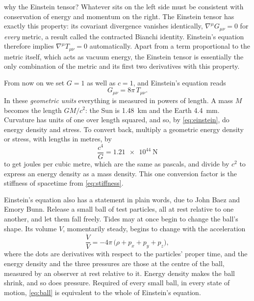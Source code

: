 \begin{deeper}{why the Einstein tensor?}
Whatever sits on the left side must be consistent with conservation of energy
and momentum on the right. The Einstein tensor has exactly this property: its
covariant divergence vanishes identically, $\nabla^{\mu}G_{\mu\nu} = 0$ for
\emph{every} metric, a result called the contracted Bianchi identity.
Einstein's equation therefore implies $\nabla^{\mu}T_{\mu\nu} = 0$
automatically. Apart from a term proportional to the metric itself, which acts
as vacuum energy, the Einstein tensor is essentially the only combination of
the metric and its first two derivatives with this property.
\end{deeper}

From now on we set $G = 1$ as well as $c = 1$, and Einstein's equation reads
\begin{equation}
  G_{\mu\nu} = 8\pi\,T_{\mu\nu}.
  \label{eq:einstein}
\end{equation}
In these \emph{geometric units} everything is measured in powers of length. A
mass $M$ becomes the length $GM/c^{2}$: the Sun is \SI{1.48}{\kilo\metre} and
the Earth \SI{4.4}{\milli\metre}. Curvature has units of one over length
squared, and so, by \cref{eq:einstein}, do energy density and stress. To
convert back, multiply a geometric energy density or stress, with lengths in
metres, by
\begin{equation}
  \frac{c^{4}}{G} = \SI{1.21e44}{\newton}
  \label{eq:conversion}
\end{equation}
to get joules per cubic metre, which are the same as pascals, and divide by
$c^{2}$ to express an energy density as a mass density. This one conversion
factor is the stiffness of spacetime from \cref{eq:stiffness}.

Einstein's equation also has a statement in plain words, due to John Baez and
Emory Bunn. Release a small ball of test particles, all at rest relative to
one another, and let them fall freely. Tides may at once begin to change the
ball's shape. Its volume $V$, momentarily steady, begins to change with the
acceleration
\begin{equation}
  \frac{\ddot V}{V} = -4\pi\,\bigl(\rho + p_{x} + p_{y} + p_{z}\bigr),
  \label{eq:ball}
\end{equation}
where the dots are derivatives with respect to the particles' proper time, and
the energy density and the three pressures are those at the centre of the
ball, measured by an observer at rest relative to it. Energy density makes the
ball shrink, and so does pressure. Required of every small ball, in every
state of motion, \cref{eq:ball} is equivalent to the whole of Einstein's
equation.

